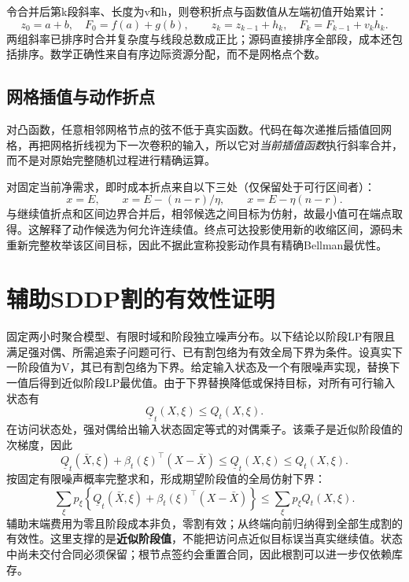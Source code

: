 令合并后第k段斜率、长度为v和h，则卷积折点与函数值从左端初值开始累计：
\begin{equation}
 z_0=a+b,\quad F_0=f(a)+g(b),\qquad
 z_k=z_{k-1}+h_k,\quad F_k=F_{k-1}+v_kh_k.
\end{equation}
两组斜率已排序时合并复杂度与线段总数成正比；源码直接排序全部段，成本还包括排序。数学正确性来自有序边际资源分配，而不是网格点个数。

\subsection{网格插值与动作折点}
对凸函数，任意相邻网格节点的弦不低于真实函数。代码在每次递推后插值回网格，再把网格折线视为下一次卷积的输入，所以它对\emph{当前插值函数}执行斜率合并，而不是对原始完整随机过程进行精确运算。

对固定当前净需求，即时成本折点来自以下三处（仅保留处于可行区间者）：
\begin{equation}
 x=E,\qquad x=E-(n-r)/\eta,\qquad x=E-\eta(n-r).
\end{equation}
与继续值折点和区间边界合并后，相邻候选之间目标为仿射，故最小值可在端点取得。这解释了动作候选为何允许连续值。终点可达投影使用新的收缩区间，源码未重新完整枚举该区间目标，因此不据此宣称投影动作具有精确Bellman最优性。

\section{辅助SDDP割的有效性证明}
固定两小时聚合模型、有限时域和阶段独立噪声分布。以下结论以阶段LP有限且满足强对偶、所需追索子问题可行、已有割包络为有效全局下界为条件。设真实下一阶段值为V，其已有割包络为下界。给定输入状态及一个有限噪声实现，替换下一值后得到近似阶段LP最优值。由于下界替换降低或保持目标，对所有可行输入状态有
\begin{equation}
 \underline Q_t(X,\xi)\le Q_t(X,\xi).
\end{equation}
在访问状态处，强对偶给出输入状态固定等式的对偶乘子。该乘子是近似阶段值的次梯度，因此
\begin{equation}
 \underline Q_t(\bar X,\xi)+\beta_t(\xi)^\top(X-\bar X)
 \le\underline Q_t(X,\xi)\le Q_t(X,\xi).
\end{equation}
按固定有限噪声概率完整求和，形成期望阶段值的全局仿射下界：
\begin{equation}
 \sum_{\xi}p_\xi\left\{\underline Q_t(\bar X,\xi)+\beta_t(\xi)^\top(X-\bar X)\right\}
 \le \sum_\xi p_\xi Q_t(X,\xi).
\end{equation}
辅助末端费用为零且阶段成本非负，零割有效；从终端向前归纳得到全部生成割的有效性。这里支撑的是\textbf{近似阶段值}，不能把访问点近似目标误当真实继续值。状态中尚未交付合同必须保留；根节点签约会重置合同，因此根割可以进一步仅依赖库存。

